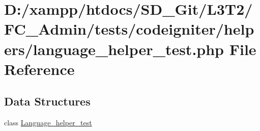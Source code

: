 \hypertarget{_admin_2tests_2codeigniter_2helpers_2language__helper__test_8php}{}\section{D\+:/xampp/htdocs/\+S\+D\+\_\+\+Git/\+L3\+T2/\+F\+C\+\_\+\+Admin/tests/codeigniter/helpers/language\+\_\+helper\+\_\+test.php File Reference}
\label{_admin_2tests_2codeigniter_2helpers_2language__helper__test_8php}
\subsection*{Data Structures}
\begin{DoxyCompactItemize}
\item 
class \hyperlink{class_language__helper__test}{Language\+\_\+helper\+\_\+test}
\end{DoxyCompactItemize}
